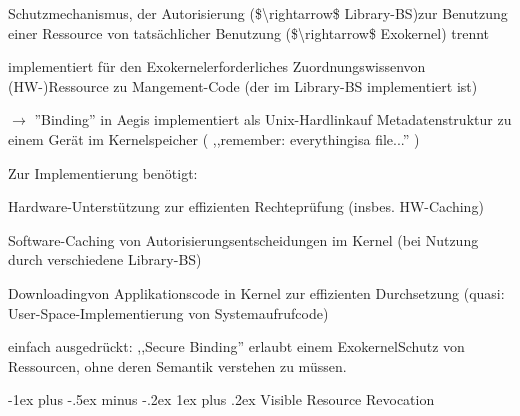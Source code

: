 \documentclass[a4paper]{article}
\makeatletter
\renewcommand{\subsubsection}{\@startsection{subsubsection}{3}{0mm}%
 {-1ex plus -.5ex minus -.2ex}%
 {1ex plus .2ex}%
 {\normalfont\small\bfseries}}
\makeatother
\begin{document}
\begin{multicols}{3}
    \begin{itemize*}
        \item
        Schutzmechanismus, der Autorisierung (\$\textbackslash rightarrow\$
        Library-BS)zur Benutzung einer Ressource von tatsächlicher Benutzung
        (\$\textbackslash rightarrow\$ Exokernel) trennt
        \item
        implementiert für den Exokernelerforderliches Zuordnungswissenvon
        (HW-)Ressource zu Mangement-Code (der im Library-BS implementiert ist)
        \item
        $\rightarrow$  ''Binding'' in Aegis implementiert als
        Unix-Hardlinkauf Metadatenstruktur zu einem Gerät im Kernelspeicher (
        ,,remember: everythingisa file...'' )
        \item
        Zur Implementierung benötigt:
        \begin{itemize*}
            \item Hardware-Unterstützung zur effizienten Rechteprüfung (insbes. HW-Caching)
            \item Software-Caching von Autorisierungsentscheidungen im Kernel (bei Nutzung durch verschiedene Library-BS)
            \item Downloadingvon Applikationscode in Kernel zur effizienten Durchsetzung (quasi: User-Space-Implementierung von Systemaufrufcode)
        \end{itemize*}
        \item
        einfach ausgedrückt: ,,Secure Binding'' erlaubt einem ExokernelSchutz
        von Ressourcen, ohne deren Semantik verstehen zu müssen.
    \end{itemize*}


    \subsubsection{Visible Resource
        Revocation}


\end{multicols}
\end{document}
